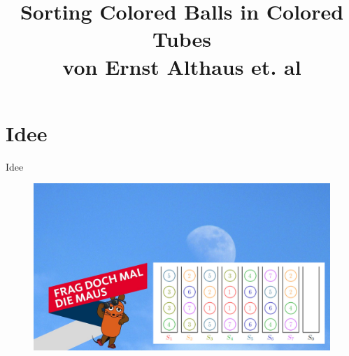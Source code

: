 \documentclass{beamer}
\author[Philipp Geier]{}
\title[Sorting Colored Balls in Colored Tubes]{Sorting Colored Balls in Colored Tubes \\ von Ernst Althaus et. al}
\institute[Universität Trier]{}
\date{}
\begin{document}
{
  \begin{frame}
    \maketitle
  \end{frame}
}
    
	

\section*{Idee}
\begin{frame}{Idee}
	\begin{figure}[ht]
		\includegraphics[width=\textwidth]{maus}
    \end{figure}
\end{frame}
\end{document}
